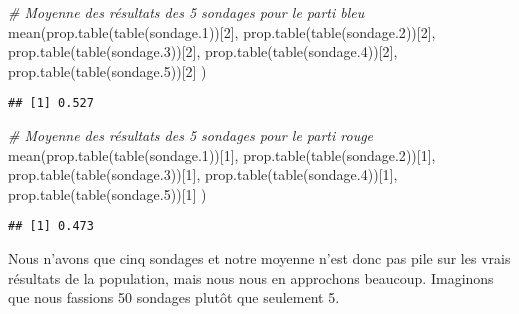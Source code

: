 \documentclass[
]{book}
\newenvironment{Shaded}{\begin{snugshade}}{\end{snugshade}}
\newcommand{\CommentTok}[1]{\textcolor[rgb]{0.56,0.35,0.01}{\textit{#1}}}
\newcommand{\DecValTok}[1]{\textcolor[rgb]{0.00,0.00,0.81}{#1}}
\newcommand{\FloatTok}[1]{\textcolor[rgb]{0.00,0.00,0.81}{#1}}
\newcommand{\FunctionTok}[1]{\textcolor[rgb]{0.00,0.00,0.00}{#1}}
\newcommand{\NormalTok}[1]{#1}
\begin{document}
\begin{Shaded}
\begin{Highlighting}[]
\CommentTok{\# Moyenne des résultats des 5 sondages pour le parti bleu}
\FunctionTok{mean}\NormalTok{(}\FunctionTok{prop.table}\NormalTok{(}\FunctionTok{table}\NormalTok{(sondage}\FloatTok{.1}\NormalTok{))[}\DecValTok{2}\NormalTok{],}
     \FunctionTok{prop.table}\NormalTok{(}\FunctionTok{table}\NormalTok{(sondage}\FloatTok{.2}\NormalTok{))[}\DecValTok{2}\NormalTok{],}
     \FunctionTok{prop.table}\NormalTok{(}\FunctionTok{table}\NormalTok{(sondage}\FloatTok{.3}\NormalTok{))[}\DecValTok{2}\NormalTok{],}
     \FunctionTok{prop.table}\NormalTok{(}\FunctionTok{table}\NormalTok{(sondage}\FloatTok{.4}\NormalTok{))[}\DecValTok{2}\NormalTok{],}
     \FunctionTok{prop.table}\NormalTok{(}\FunctionTok{table}\NormalTok{(sondage}\FloatTok{.5}\NormalTok{))[}\DecValTok{2}\NormalTok{]}
\NormalTok{     )}
\end{Highlighting}
\end{Shaded}

\begin{verbatim}
## [1] 0.527
\end{verbatim}

\begin{Shaded}
\begin{Highlighting}[]
\CommentTok{\# Moyenne des résultats des 5 sondages pour le parti rouge}
\FunctionTok{mean}\NormalTok{(}\FunctionTok{prop.table}\NormalTok{(}\FunctionTok{table}\NormalTok{(sondage}\FloatTok{.1}\NormalTok{))[}\DecValTok{1}\NormalTok{],}
     \FunctionTok{prop.table}\NormalTok{(}\FunctionTok{table}\NormalTok{(sondage}\FloatTok{.2}\NormalTok{))[}\DecValTok{1}\NormalTok{],}
     \FunctionTok{prop.table}\NormalTok{(}\FunctionTok{table}\NormalTok{(sondage}\FloatTok{.3}\NormalTok{))[}\DecValTok{1}\NormalTok{],}
     \FunctionTok{prop.table}\NormalTok{(}\FunctionTok{table}\NormalTok{(sondage}\FloatTok{.4}\NormalTok{))[}\DecValTok{1}\NormalTok{],}
     \FunctionTok{prop.table}\NormalTok{(}\FunctionTok{table}\NormalTok{(sondage}\FloatTok{.5}\NormalTok{))[}\DecValTok{1}\NormalTok{]}
\NormalTok{     )}
\end{Highlighting}
\end{Shaded}

\begin{verbatim}
## [1] 0.473
\end{verbatim}

Nous n'avons que cinq sondages et notre moyenne n'est donc pas pile sur les vrais résultats de la population, mais nous nous en approchons beaucoup. Imaginons que nous fassions 50 sondages plutôt que seulement 5.
\end{document}
